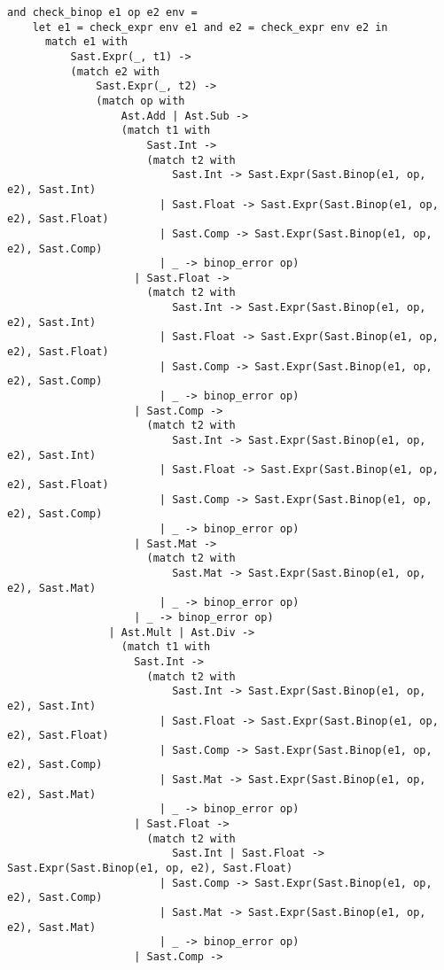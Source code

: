 \begin{lstlisting}
and check_binop e1 op e2 env =
    let e1 = check_expr env e1 and e2 = check_expr env e2 in
      match e1 with
          Sast.Expr(_, t1) ->
          (match e2 with
              Sast.Expr(_, t2) ->
              (match op with
                  Ast.Add | Ast.Sub ->
                  (match t1 with
                      Sast.Int -> 
                      (match t2 with
                          Sast.Int -> Sast.Expr(Sast.Binop(e1, op, e2), Sast.Int)
                        | Sast.Float -> Sast.Expr(Sast.Binop(e1, op, e2), Sast.Float)
                        | Sast.Comp -> Sast.Expr(Sast.Binop(e1, op, e2), Sast.Comp)
                        | _ -> binop_error op)
                    | Sast.Float -> 
                      (match t2 with
                          Sast.Int -> Sast.Expr(Sast.Binop(e1, op, e2), Sast.Int)
                        | Sast.Float -> Sast.Expr(Sast.Binop(e1, op, e2), Sast.Float)
                        | Sast.Comp -> Sast.Expr(Sast.Binop(e1, op, e2), Sast.Comp)
                        | _ -> binop_error op)
                    | Sast.Comp -> 
                      (match t2 with
                          Sast.Int -> Sast.Expr(Sast.Binop(e1, op, e2), Sast.Int)
                        | Sast.Float -> Sast.Expr(Sast.Binop(e1, op, e2), Sast.Float)
                        | Sast.Comp -> Sast.Expr(Sast.Binop(e1, op, e2), Sast.Comp)
                        | _ -> binop_error op)
                    | Sast.Mat ->
                      (match t2 with
                          Sast.Mat -> Sast.Expr(Sast.Binop(e1, op, e2), Sast.Mat)
                        | _ -> binop_error op)
                    | _ -> binop_error op)
                | Ast.Mult | Ast.Div ->
                  (match t1 with
                    Sast.Int -> 
                      (match t2 with
                          Sast.Int -> Sast.Expr(Sast.Binop(e1, op, e2), Sast.Int)
                        | Sast.Float -> Sast.Expr(Sast.Binop(e1, op, e2), Sast.Float)
                        | Sast.Comp -> Sast.Expr(Sast.Binop(e1, op, e2), Sast.Comp)
                        | Sast.Mat -> Sast.Expr(Sast.Binop(e1, op, e2), Sast.Mat)
                        | _ -> binop_error op)
                    | Sast.Float -> 
                      (match t2 with
                          Sast.Int | Sast.Float -> Sast.Expr(Sast.Binop(e1, op, e2), Sast.Float)
                        | Sast.Comp -> Sast.Expr(Sast.Binop(e1, op, e2), Sast.Comp)
                        | Sast.Mat -> Sast.Expr(Sast.Binop(e1, op, e2), Sast.Mat)
                        | _ -> binop_error op)
                    | Sast.Comp -> 

\end{lstlisting}

